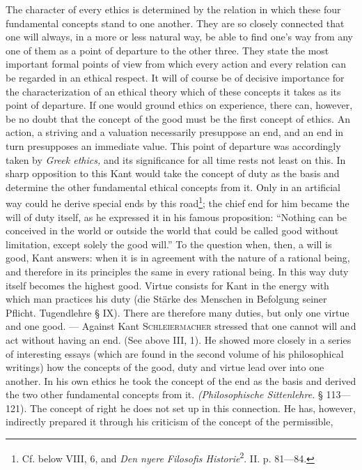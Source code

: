 \documentclass[12pt,a4paper,openany]{book}
\newcommand{\opage}[1]{\marginnote{\footnotesize\textit{[#1]}}}
\begin{document}
The character of every ethics is determined by the relation in which these four fundamental concepts stand
to one another. They are so closely connected that one will always, in a more or less natural way, be able
to find one's way from any one of them as a point of departure to the other three. They state the most
important formal points of view from which every action and every relation can be regarded in an ethical
respect. It will of course be of decisive importance for the characterization of an ethical theory which of
these concepts it takes as its point of departure. If one would ground ethics on experience, there can,
however, be no doubt that the concept of the good must be the first concept of ethics. An action, a striving
and a valuation necessarily presuppose an end, and an end in turn presupposes an immediate value. This point
of departure was accordingly taken by \textit{Greek ethics,} and its significance for all time rests not
least on this. In sharp opposition to this Kant would take the concept of duty as the basis and determine the
other fundamental ethical concepts from it. Only in an artificial way could he derive special
\opage{158}ends by this road\footnote[1]{Cf. below VIII, 6, and \textit{Den nyere Filosofis
Historie}\textsuperscript{2}. II. p. 81---84.}; the chief end for him became the will of duty itself, as he
expressed it in his famous proposition: ``Nothing can be conceived in the world or outside the world that
could be called good without limitation, except solely the good will.'' To the question when, then, a will
is good, Kant answers: when it is in agreement with the nature of a rational being, and therefore in its
principles the same in every rational being. In this way duty itself becomes the highest good. Virtue
consists for Kant in the energy with which man practices his duty (die Stärke des Menschen in Befolgung
seiner Pflicht. Tugendlehre § IX). There are therefore many duties, but only one virtue and one good. ---
Against Kant \textsc{Schleiermacher} stressed that one cannot will and act without having an end. (See above
III, 1). He showed more closely in a series of interesting essays (which are found in the second volume of his
philosophical writings) how the concepts of the good, duty and virtue lead over into one another. In his own
ethics he took the concept of the end as the basis and derived the two other fundamental concepts from it.
\textit{(Philosophische Sittenlehre.} § 113---121). The concept of right he does not set up in this
connection. He has, however, indirectly prepared it through his criticism of the concept of the permissible,
\end{document}
